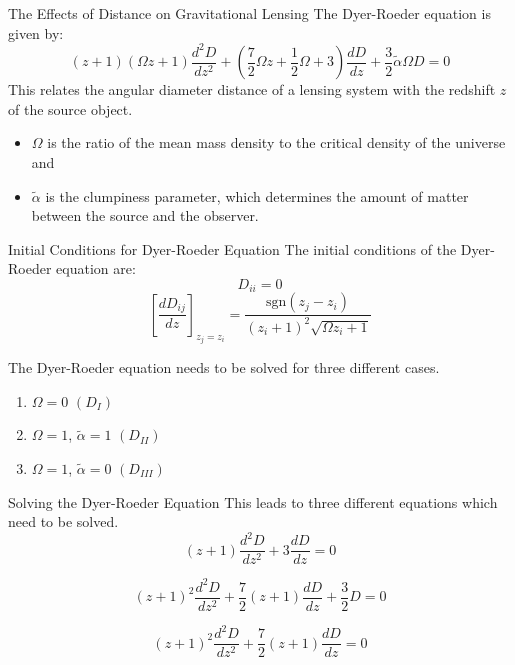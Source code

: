 \documentclass[aspectratio=1610,xcolor=dvipsnames,t]{beamer}
\begin{document}
\begin{frame}{The Effects of Distance on Gravitational Lensing}
The Dyer-Roeder equation is given by:
\begin{equation}
    (z+1)(\Omega z + 1) \frac{d^2D}{dz^2} + 
    \left( \frac{7}{2}\Omega z + \frac{1}{2}\Omega + 3 \right) \frac{dD}{dz} + 
    \frac{3}{2} \tilde{\alpha} \Omega D = 0
\end{equation}
This relates the angular diameter distance of a lensing system with the
redshift $z$ of the source object.
\begin{itemize}
    \item $\Omega$ is the ratio of the mean mass density to the critical
          density of the universe and
    \item $\tilde{\alpha}$ is the clumpiness parameter, which determines
          the amount of matter between the source and the observer.
\end{itemize}
\end{frame} 

\begin{frame}{Initial Conditions for Dyer-Roeder Equation} 
The initial conditions of the Dyer-Roeder equation are:
\begin{equation}
    D_{ii} = 0
\end{equation}
\begin{equation}
    \left[ \frac{dD_{ij}}{dz} \right]_{z_j = z_i} =
         \frac{\mathrm{sgn} (z_j - z_i)}{(z_i + 1)^2 \sqrt{\Omega z_i + 1} }
\end{equation}

The Dyer-Roeder equation needs to be solved for three different cases.
\begin{enumerate}
    \item  $\Omega = 0$ $(D_{I})$
    \item  $\Omega = 1$, $\tilde{\alpha} = 1$ $(D_{II})$
    \item  $\Omega = 1$, $\tilde{\alpha} = 0$ $(D_{III})$
\end{enumerate}
\end{frame} 

\begin{frame}{Solving the Dyer-Roeder Equation} 
This leads to three different equations which need to be solved.
\begin{equation}
    (z+1)\frac{d^2D}{dz^2} + 3 \frac{dD}{dz} = 0
\end{equation}

\begin{equation}
    (z+1)^2 \frac{d^2D}{dz^2} + \frac{7}{2}(z+1)\frac{dD}{dz} + \frac{3}{2}D = 0
\end{equation}

\begin{equation}
    (z+1)^2 \frac{d^2D}{dz^2} + \frac{7}{2}(z+1)\frac{dD}{dz} = 0
\end{equation}
\end{frame} 
\end{document}

